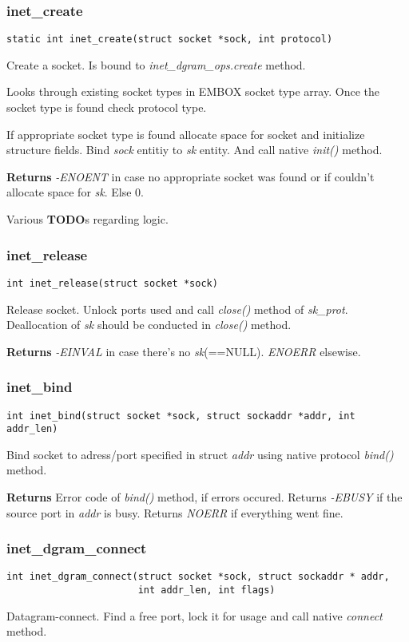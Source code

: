 \documentclass[12pt,a4paper]{article}
\begin{document}
\subsubsection{inet\_create}
\label{sec:embox_net_inet_create}
\begin{verbatim}
static int inet_create(struct socket *sock, int protocol)
\end{verbatim}
Create a socket. Is bound to {\it inet\_dgram\_ops.create} method.

Looks through existing socket types in EMBOX socket type array. Once the socket
type is found check protocol type.

If appropriate socket type is found allocate space for socket and initialize
structure fields. Bind {\it sock} entitiy to {\it sk} entity. And call native
{\it init()} method.

{\bf Returns} {\it -ENOENT} in case no appropriate socket was found or if
couldn't allocate space for {\it sk}. Else 0.

Various {\bf TODO}s regarding logic.

\subsubsection{inet\_release}
\label{sec:embox_net_release}
\begin{verbatim}
int inet_release(struct socket *sock)
\end{verbatim}
Release socket. Unlock ports used and call {\it close()} method of
{\it sk\_prot}. Deallocation of {\it sk} should be conducted in {\it close()}
method.

{\bf Returns} {\it -EINVAL} in case there's no {\it sk}(==NULL). {\it ENOERR}
elsewise.

\subsubsection{inet\_bind}
\label{sec:embox_net_inet_bind}
\begin{verbatim}
int inet_bind(struct socket *sock, struct sockaddr *addr, int addr_len)
\end{verbatim}
Bind socket to adress/port specified in struct {\it addr} using native protocol
{\it bind()} method.

{\bf Returns} Error code of {\it bind()} method, if errors occured. Returns
{\it -EBUSY} if the source port in {\it addr} is busy. Returns {\it NOERR}
if everything went fine.

\subsubsection{inet\_dgram\_connect}
\label{sec:embox_net_inet_dgram_connect}
\begin{verbatim}
int inet_dgram_connect(struct socket *sock, struct sockaddr * addr,
                       int addr_len, int flags)
\end{verbatim}
Datagram-connect. Find a free port, lock it for usage and call native
{\it connect} method.
\end{document}
